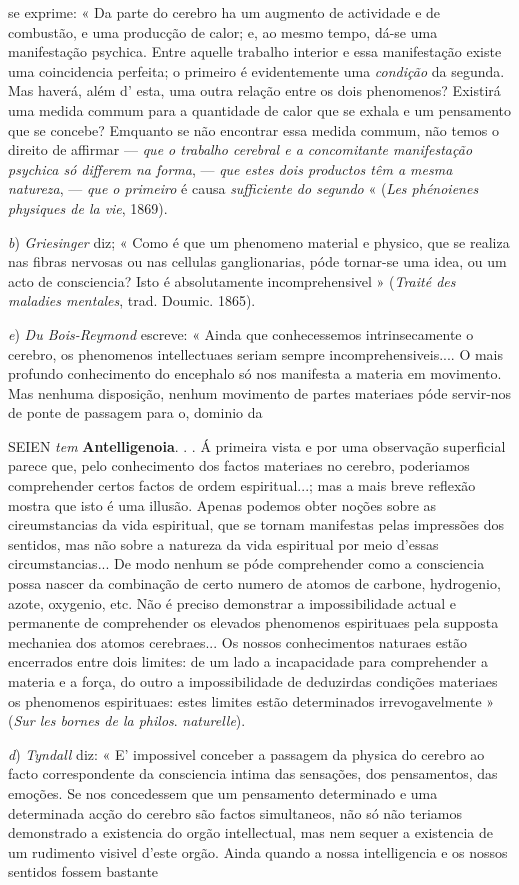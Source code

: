 se exprime: « Da parte do cerebro ha um augmento de actividade e de combustão, e uma producção de calor; e, ao mesmo tempo, dá-se uma manifestação psychica. Entre aquelle trabalho interior e essa manifestação existe uma coincidencia perfeita; o primeiro é evidentemente uma \emph{condição} da segunda. Mas haverá, além d' esta, uma outra relação entre os dois phenomenos? Existirá uma medida commum para a quantidade de calor que se exhala e um pensamento que se concebe? Emquanto se não encontrar essa medida commum, não temos o direito de affirmar --- \emph{que o trabalho cerebral e a concomitante manifestação psychica só differem na forma}, --- \emph{que estes dois productos têm a mesma natureza}, --- \emph{que o primeiro} é causa \emph{sufficiente do segundo} « (\emph{Les phénoienes physiques de la vie}, 1869).\par \emph{b}) \emph{Griesinger} diz; « Como é que um phenomeno material e physico, que se realiza nas fibras nervosas ou nas cellulas ganglionarias, póde tornar-se uma idea, ou um acto de consciencia? Isto é absolutamente incomprehensivel » (\emph{Traité des maladies mentales}, trad. Doumic. 1865).\par \emph{e}) \emph{Du Bois-Reymond} escreve: « Ainda que conhecessemos intrinsecamente o cerebro, os phenomenos intellectuaes seriam sempre incomprehensiveis.... O mais profundo conhecimento do encephalo só nos manifesta a materia em movimento. Mas nenhuma disposição, nenhum movimento de partes materiaes póde servir-nos de ponte de passagem para o, dominio da\par SEIEN \emph{tem} \textbf{Antelligenoia}. . . Á primeira vista e por uma observação superficial parece que, pelo conhecimento dos factos materiaes no cerebro, poderiamos comprehender certos factos de ordem espiritual...; mas a mais breve reflexão mostra que isto é uma illusão. Apenas podemos obter noções sobre as cireumstancias da vida espiritual, que se tornam manifestas pelas impressões dos sentidos, mas não sobre a natureza da vida espiritual por meio d'essas circumstancias... De modo nenhum se póde comprehender como a consciencia possa nascer da combinação de certo numero de atomos de carbone, hydrogenio, azote, oxygenio, etc. Não é preciso demonstrar a impossibilidade actual e permanente de comprehender os elevados phenomenos espirituaes pela supposta mechaniea dos atomos cerebraes... Os nossos conhecimentos naturaes estão encerrados entre dois limites: de um lado a incapacidade para comprehender a materia e a força, do outro a impossibilidade de deduzirdas condições materiaes os phenomenos espirituaes: estes limites estão determinados irrevogavelmente » (\emph{Sur les bornes de la philos}. \emph{naturelle}).\par \emph{d}) \emph{Tyndall} diz: « E' impossivel conceber a passagem da physica do cerebro ao facto correspondente da consciencia intima das sensações, dos pensamentos, das emoções. Se nos concedessem que um pensamento determinado e uma determinada acção do cerebro são factos simultaneos, não só não teriamos demonstrado a existencia do orgão intellectual, mas nem sequer a existencia de um rudimento visivel d'este orgão. Ainda quando a nossa intelligencia e os nossos sentidos fossem bastante 